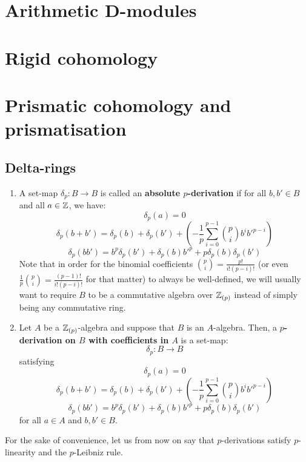     \section{Arithmetic D-modules}
    
    \section{Rigid cohomology}
        
    \section{Prismatic cohomology and prismatisation}
        \subsection{Delta-rings}
            \begin{definition}[$p$-derivations] \label{def: p_derivations}
                \noindent
                \begin{enumerate}
                    \item A set-map $\delta_p: B \to B$ is called an \textbf{absolute $p$-derivation} if for all $b, b' \in B$ and all $a \in \mathbb{Z}$, we have:
                        $$\delta_p(a) = 0$$
                        $$\delta_p(b + b') = \delta_p(b) + \delta_p(b') + \left(-\frac1p\sum_{i=0}^{p-1} \binom{p}{i} b^ib'^{p-i}\right)$$
                        $$\delta_p(bb') = b^p\delta_p(b') + \delta_p(b)b'^p + p\delta_p(b)\delta_p(b')$$
                    Note that in order for the binomial coefficients $\binom{p}{i} = \frac{p!}{i! (p - i)!}$ (or even $\frac1p \binom{p}{i} = \frac{(p - 1)!}{i! (p - i)!}$ for that matter) to always be well-defined, we will usually want to require $B$ to be a commutative algebra over $\mathbb{Z}_{(p)}$ instead of simply being any commutative ring. 
                    \item Let $A$ be a $\mathbb{Z}_{(p)}$-algebra and suppose that $B$ is an $A$-algebra. Then, a \textbf{$p$-derivation on $B$ with coefficients in $A$} is a set-map:
                        $$\delta_p: B \to B$$
                    satisfying
                        $$\delta_p(a) = 0$$
                        $$\delta_p(b + b') = \delta_p(b) + \delta_p(b') + \left(-\frac1p\sum_{i=0}^{p-1} \binom{p}{i} b^ib'^{p-i}\right)$$
                        $$\delta_p(bb') = b^p\delta_p(b') + \delta_p(b)b'^p + p\delta_p(b)\delta_p(b')$$
                    for all $a \in A$ and $b, b' \in B$.
                \end{enumerate}
            \end{definition}
            \begin{convention}
                For the sake of convenience, let us from now on say that $p$-derivations satisfy $p$-linearity and the $p$-Leibniz rule.
            \end{convention}
            

